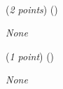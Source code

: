 \documentclass{template}
\begin{document}
\begin{problem}
~\newline
~\newline


\begin{subproblem}
(\textit{2 points}) (\scorecodeemoji{})


\end{subproblem}

\begin{solution}
\textit{None}
\end{solution}

\begin{subproblem}
(\textit{1 point}) (\scorecodeemoji{})


\end{subproblem}

\begin{solution}
\textit{None}
\end{solution}
\end{problem}

\newpage
\end{document}
